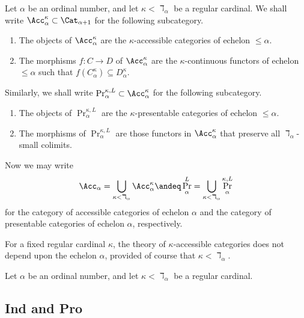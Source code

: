 \begin{notation}
	Let $ \alpha $ be an ordinal number, and
	let $ \kappa < \daleth_{\alpha} $ be a regular cardinal.
	We shall write $ \Acc^{\kappa}_{\alpha} \subset \Cat_{\alpha+1} $ for
	the following subcategory.
	\begin{enumerate}
		\item The objects of $ \Acc^{\kappa}_{\alpha} $ are
			the $ \kappa $-accessible categories of echelon $ \leq \alpha $.
		\item The morphisms $ f \colon C \to D $ of $ \Acc^{\kappa}_{\alpha} $ are
			the $ \kappa $-continuous functors of echelon $ \leq \alpha $
			such that $ f(C^{\kappa}_{\alpha}) \subseteq D^{\kappa}_{\alpha} $.
	\end{enumerate}
	Similarly, we shall write $ \Pr^{\kappa,L}_{\alpha} \subset \Acc^{\kappa}_{\alpha}$
	for the following subcategory.
	\begin{enumerate}
		\item The objects of $ \Pr^{\kappa,L}_{\alpha} $ are
			the $ \kappa $-presentable categories of echelon $ \leq \alpha $.
		\item The morphisms of $ \Pr^{\kappa,L}_{\alpha} $ are
			those functors in $ \Acc^{\kappa}_{\alpha} $
			that preserve all $ \daleth_{\alpha} $-small colimits.
	\end{enumerate}

	Now we may write
	\[
		\Acc_{\alpha} = \bigcup_{\kappa < \daleth_{\alpha}} \Acc^{\kappa}_{\alpha}
		\andeq 
		\Pr^L_{\alpha} = \bigcup_{\kappa < \daleth_{\alpha}} \Pr^{\kappa,L}_{\alpha}
	\]
	for the category of accessible categories of echelon $ \alpha $
	and the category of presentable categories of echelon $ \alpha $, respectively.
\end{notation}

For a fixed regular cardinal $ \kappa $,
the theory of $ \kappa $-accessible categories
does not depend upon the echelon $ \alpha $,
provided of course that $ \kappa < \daleth_{\alpha} $.

\begin{theorem}
	Let $ \alpha $ be an ordinal number, and
	let $ \kappa < \daleth_{\alpha} $ be a regular cardinal.

\end{theorem}

\subsection{Ind and Pro}%
\label{sub:ind_and_pro}

